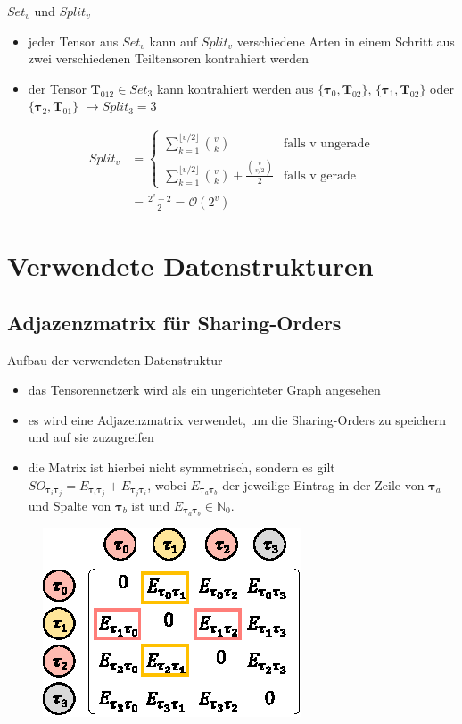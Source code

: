 \documentclass{beamer}
\begin{document}
\begin{frame}{$Set_v$ und $Split_v$}
	\begin{itemize}
		\item jeder Tensor aus $Set_v$ kann auf $Split_v$ verschiedene Arten in einem Schritt aus zwei verschiedenen Teiltensoren kontrahiert werden
		\item der Tensor $\bm{T}_{012} \in Set_3$ kann kontrahiert werden aus $\{\bm{\tau}_0, \bm{T}_{02} \}$, $\{\bm{\tau}_{1}, \bm{T}_{02} \}$ oder $\{\bm{\tau}_{2}, \bm{T}_{01} \}$ $\rightarrow Split_3 = 3$
	\end{itemize}
	\begin{align*}
		Split_v & = \begin{cases}
			            \sum^{\lfloor v/2 \rfloor}_{k=1} \binom{v}{k}                            & \text{falls v ungerade} \\
			            \sum^{\lfloor v/2 \rfloor}_{k=1} \binom{v}{k} + \frac{\binom{v}{v/2}}{2} & \text{falls v gerade}
		            \end{cases} \\
		        & = \frac{2^v - 2}{2} = \mathcal{O}(2^v)
	\end{align*}
\end{frame}


\section{Verwendete Datenstrukturen}
\subsection{Adjazenzmatrix für Sharing-Orders}

\begin{frame}{Aufbau der verwendeten Datenstruktur}
	\begin{itemize}
		\item das Tensorennetzerk wird als ein ungerichteter Graph angesehen
		\item es wird eine Adjazenzmatrix verwendet, um die Sharing-Orders zu speichern und auf sie zuzugreifen
		\item die Matrix ist hierbei nicht symmetrisch,
		      sondern es gilt $SO_{\bm{\tau}_i \bm{\tau}_j} = E_{\bm{\tau}_i \bm{\tau}_j} + E_{\bm{\tau}_j \bm{\tau}_i}$, wobei $E_{\bm{\tau}_a \bm{\tau}_b}$ der jeweilige Eintrag in der Zeile von $\bm{\tau}_a$ und Spalte von $\bm{\tau}_b$ ist und $E_{\bm{\tau}_a \bm{\tau}_b} \in \mathbb{N}_0$.
	\end{itemize}
	\begin{figure}
		\includegraphics{figure_05_a}
	\end{figure}
\end{frame}
\end{document}
